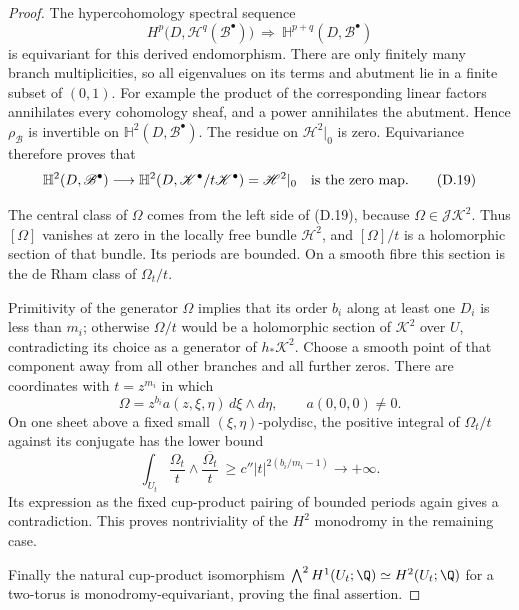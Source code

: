 \begin{proof}
The hypercohomology spectral sequence
\[
 H^p\bigl(D,\mathcal H^q(\mathscr B^\bullet)\bigr)
 \ \Longrightarrow\ \mathbb H^{p+q}(D,\mathscr B^\bullet)
\]
is equivariant for this derived endomorphism. There are only
finitely many branch multiplicities, so all eigenvalues on its
terms and abutment lie in a finite subset of $(0,1)$. For
example the product of the corresponding linear factors
annihilates every cohomology sheaf, and a power annihilates the
abutment. Hence $\rho_{\mathscr B}$ is invertible on
$\mathbb H^2(D,\mathscr B^\bullet)$. The residue on
$\mathscr H^2|_0$ is zero. Equivariance therefore proves that
\[
 \mathbb H^2(D,\mathscr B^\bullet)\longrightarrow
 \mathbb H^2(D,\mathscr K^\bullet/t\mathscr K^\bullet)
       =\mathscr H^2|_0
 \quad\hbox{is the zero map}.
\tag{D.19}
\]

The central class of $\Omega$ comes from the left side of
(D.19), because $\Omega\in\mathscr J\mathscr K^2$.
Thus $[\Omega]$ vanishes at zero in the locally free bundle
$\mathscr H^2$, and $[\Omega]/t$ is a holomorphic section of
that bundle. Its periods are bounded. On a smooth fibre this
section is the de Rham class of $\Omega_t/t$.

Primitivity of the generator $\Omega$ implies that its order
$b_i$ along at least one $D_i$ is less than $m_i$; otherwise
$\Omega/t$ would be a holomorphic section of $\mathscr K^2$
over $U$, contradicting its choice as a generator of
$h_*\mathscr K^2$. Choose a smooth point of that component
away from all other branches and all further zeros. There
are coordinates with $t=z^{m_i}$ in which
\[
 \Omega=z^{b_i}a(z,\xi,\eta)\,d\xi\wedge d\eta,
 \qquad a(0,0,0)\ne0.
\]
On one sheet above a fixed small $(\xi,\eta)$-polydisc, the
positive integral of $\Omega_t/t$ against its conjugate has
the lower bound
\[
 \int_{U_t}\frac{\Omega_t}{t}\wedge
                    \overline{\frac{\Omega_t}{t}}
 \ \ge c''|t|^{2(b_i/m_i-1)}\longrightarrow+\infty.
\]
Its expression as the fixed cup-product pairing of bounded
periods again gives a contradiction. This proves nontriviality
of the $H^2$ monodromy in the remaining case.

Finally the natural
cup-product isomorphism
$\bigwedge^2H^1(U_t;\Q)\simeq H^2(U_t;\Q)$ for a two-torus
is monodromy-equivariant, proving the final assertion.
\end{proof}



